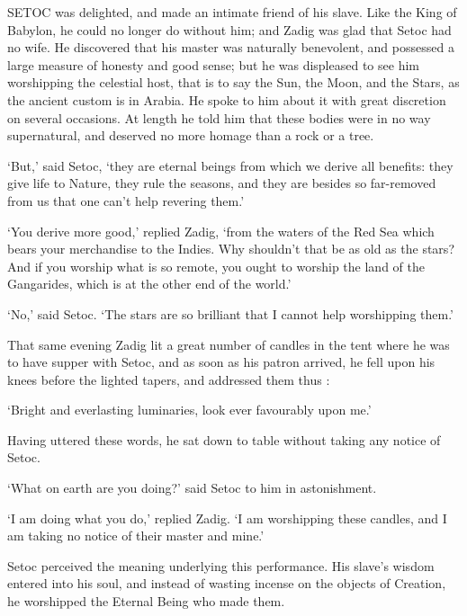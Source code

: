 \documentclass{article}
\begin{document}
\begin{center}
 

SETOC was delighted, and made an intimate friend of his slave. Like the King of 
Babylon, he could no longer do without him; and Zadig was glad that Setoc had no 
wife. He discovered that his master was naturally benevolent, and possessed a large 
measure of honesty and good sense; but he was displeased to see him worshipping 
the celestial host, that is to say the Sun, the Moon, and the Stars, as the ancient 
custom is in Arabia. He spoke to him about it with great discretion on several 
occasions. At length he told him that these bodies were in no way supernatural, 
and deserved no more homage than a rock or a tree. 

`But,' said Setoc, `they are eternal beings from which we derive all benefits: 
they give life to Nature, they rule the seasons, and they are besides so far-removed 
from us that one can't help revering them.' 

`You derive more good,' replied Zadig, `from the waters of the Red Sea which bears 
your merchandise to the Indies. Why shouldn't that be as old as the stars? And 
if you worship what is so remote, you ought to worship the land of the Gangarides, 
which is at the other end of the world.' 

`No,' said Setoc. `The stars are so brilliant that I cannot help worshipping them.' 

That same evening Zadig lit a great number of candles in the tent where he was 
to have supper with Setoc, and as soon as his patron arrived, he fell upon his 
knees before the lighted tapers, and addressed them thus : 

`Bright and everlasting luminaries, look ever favourably upon me.' 

Having uttered these words, he sat down to table without taking any notice of Setoc. 

`What on earth are you doing?' said Setoc to him in astonishment. 

`I am doing what you do,' replied Zadig. `I am worshipping these candles, and I 
am taking no notice of their master and mine.' 

Setoc perceived the meaning underlying this performance. His slave's wisdom entered 
into his soul, and instead of wasting incense on the objects of Creation, he worshipped 
the Eternal Being who made them. 


\end{center}
\end{document}
